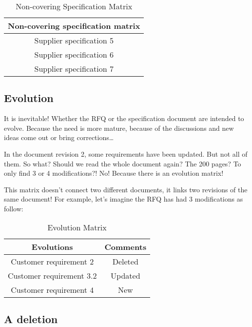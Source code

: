 \begin{table*}
	\centering
		\begin{tabular}{|c|}
			\hline
			\textbf{Non-covering specification matrix}\\
            \hline
            Supplier specification 5\\
            \hline
            Supplier specification 6\\
            \hline
            Supplier specification 7\\
            \hline
		\end{tabular}
	\caption{Non-covering Specification Matrix}
	\label{tab:NonCoveringSpecificationMatrix}
\end{table*}

\subsection{Evolution}
It is inevitable! Whether the RFQ or the specification document are intended to evolve. Because the need is more mature, because of the discussions and new ideas come out or bring corrections…

In the document revision 2, some requirements have been updated. But not all of them. So what? Should we read the whole document again? The 200 pages? To only find 3 or 4 modifications?! No! Because there is an evolution matrix!

This matrix doesn’t connect two different documents, it links two revisions of the same document! For example, let’s imagine the RFQ has had 3 modifications as follow:

\begin{table*}
	\centering
		\begin{tabular}{|c|c|}
			\hline
			\textbf{Evolutions} & \textbf{Comments}\\
            \hline
            Customer requirement 2 & Deleted\\
            \hline
            Customer requirement 3.2 & Updated\\
            \hline
            Customer requirement 4 & New\\
            \hline
		\end{tabular}
	\caption{Evolution Matrix}
	\label{tab:EvolutionMatrix}
\end{table*}

\subsection{A deletion}

